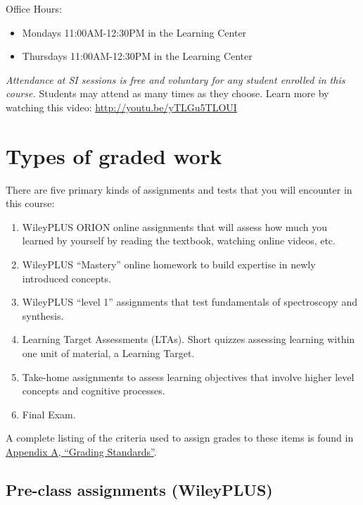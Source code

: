 Office Hours:

\begin{itemize}
\tightlist
\item
  Mondays 11:00AM-12:30PM in the Learning Center
\item
  Thursdays 11:00AM-12:30PM in the Learning Center
\end{itemize}

\emph{Attendance at SI sessions is free and voluntary for any student
enrolled in this course.} Students may attend as many times as they
choose. Learn more by watching this video:
\url{http://youtu.be/yTLGu5TLOUI}

\hypertarget{types-of-graded-work}{%
\section{Types of graded work}\label{types-of-graded-work}}

There are five primary kinds of assignments and tests that you will
encounter in this course:

\begin{enumerate}
\def\labelenumi{\arabic{enumi}.}
\tightlist
\item
  WileyPLUS ORION online assignments that will assess how much you
  learned by yourself by reading the textbook, watching online videos,
  etc.\\
\item
  WileyPLUS ``Mastery'' online homework to build expertise in newly
  introduced concepts.
\item
  WileyPLUS ``level 1'' assignments that test fundamentals of
  spectroscopy and synthesis.
\item
  Learning Target Assessments (LTAs). Short quizzes assessing learning
  within one unit of material, a Learning Target.
\item
  Take-home assignments to assess learning objectives that involve
  higher level concepts and cognitive processes.
\item
  Final Exam.
\end{enumerate}

A complete listing of the criteria used to assign grades to these items
is found in \protect\hyperlink{rubrics}{Appendix A, ``Grading
Standards''}.

\hypertarget{pre-class-assignments-wileyplus}{%
\subsection{Pre-class assignments
(WileyPLUS)}\label{pre-class-assignments-wileyplus}}

